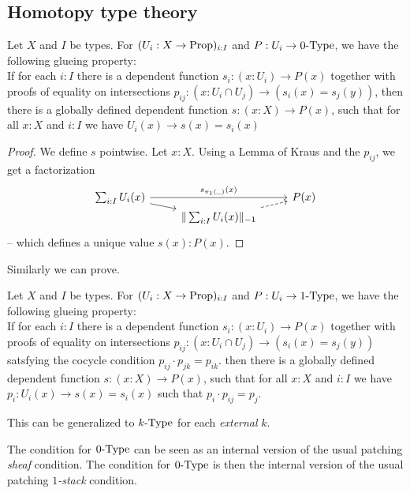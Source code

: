 \subsection{Homotopy type theory}

\begin{lemma}%
  \label{kraus-glueing}
  Let $X$ and $I$ be types.
  For $(U_i:X \to \mathrm{Prop})_{i:I}$ and $P:U_i\to 0\mbox{-}\mathrm{Type}$, we have the following glueing property: \\
  If for each $i:I$ there is a dependent function $s_i:(x:U_i)\to P(x)$ together with
  proofs of equality on intersections $p_{ij}:(x:U_i\cap U_j)\to (s_i(x)=s_j(y))$,
  then there is a globally defined dependent function $s:(x:X) \to P(x)$,
  such that for all $x:X$ and $i:I$ we have $U_i(x) \to s(x)=s_i(x)$
\end{lemma}

\begin{proof}
  We define $s$ pointwise.
  Let $x:X$.
  Using a Lemma of Kraus and the $p_{ij}$, we get a factorization
  \[ \begin{tikzcd}[row sep=0mm]
    \sum_{i:I} U_i(x) \ar[rr, "s_{\pi_1(\_)}(x)"]\ar[rd] & & P(x) \\
    & \|\sum_{i:I} U_i(x)\|_{-1}\ar[ru,dashed] &
  \end{tikzcd} \]
-- which defines a unique value $s(x):P(x)$.
\end{proof}

Similarly we can prove.

\begin{lemma}%
  \label{kraus-glueing-1-type}
  Let $X$ and $I$ be types.
  For $(U_i:X \to \mathrm{Prop})_{i:I}$ and $P:U_i\to 1\mbox{-}\mathrm{Type}$, we have the following glueing property: \\
  If for each $i:I$ there is a dependent function $s_i:(x:U_i)\to P(x)$ together with
  proofs of equality on intersections $p_{ij}:(x:U_i\cap U_j)\to (s_i(x)=s_j(y))$ satsfying the cocycle
  condition $p_{ij}\cdot p_{jk} = p_{ik}$.
  then there is a globally defined dependent function $s:(x:X) \to P(x)$,
  such that for all $x:X$ and $i:I$ we have $p_i:U_i(x) \to s(x)=s_i(x)$ such that $p_i\cdot p_{ij} = p_j$.
\end{lemma}

This can be generalized to $k\mbox{-}\mathrm{Type}$ for each {\em external} $k$.

The condition for $0\mbox{-}\mathrm{Type}$ can be seen as an internal version of the usual patching {\em sheaf} condition.
The condition for $0\mbox{-}\mathrm{Type}$ is then the internal version of the usual patching {\em $1$-stack} condition.

